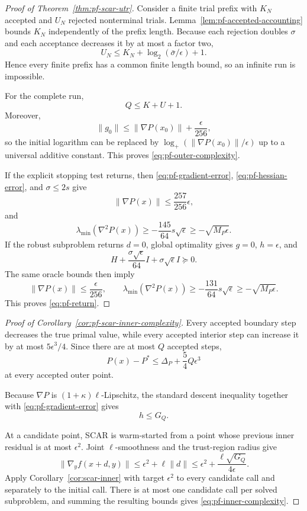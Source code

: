 \begin{proof}[Proof of Theorem~\ref{thm:pf-scar-utr}]
Consider a finite trial prefix with $K_N$ accepted and $U_N$
rejected nonterminal trials.
Lemma~\ref{lem:pf-accepted-accounting} bounds $K_N$ independently of
the prefix length.
Because each rejection doubles $\sigma$ and each acceptance decreases
it by at most a factor two,
\[
    U_N
    \le
    K_N+
    \log_2(\bar\sigma/\epsilon)+1.
\]
Hence every finite prefix has a common finite length bound, so an
infinite run is impossible.

For the complete run,
\[
    Q
    \le
    K+U+1.
\]
Moreover,
\[
    \|g_0\|
    \le
    \|\nabla P(x_0)\|
    +
    \frac{\epsilon}{256},
\]
so the initial logarithm can be replaced by
$\log_+(\|\nabla P(x_0)\|/\epsilon)$ up to a universal additive
constant. This proves \eqref{eq:pf-outer-complexity}.

If the explicit stopping test returns, then
\eqref{eq:pf-gradient-error},
\eqref{eq:pf-hessian-error},
and $\sigma\le2s$ give
\[
    \|\nabla P(x)\|
    \le
    \frac{257}{256}\epsilon,
\]
and
\[
    \lambda_{\min}(\nabla^2P(x))
    \ge
    -\frac{145}{64}s\sqrt\epsilon
    \ge
    -\sqrt{M_P\epsilon}.
\]
If the robust subproblem returns $d=0$, global optimality gives
$g=0$, $h=\epsilon$, and
\[
    H+
    \frac{\sigma\sqrt\epsilon}{64}I
    +
    \sigma\sqrt\epsilon I
    \succeq0.
\]
The same oracle bounds then imply
\[
    \|\nabla P(x)\|
    \le
    \frac{\epsilon}{256},
    \qquad
    \lambda_{\min}(\nabla^2P(x))
    \ge
    -\frac{131}{64}s\sqrt\epsilon
    \ge
    -\sqrt{M_P\epsilon}.
\]
This proves \eqref{eq:pf-return}.
\end{proof}


\begin{proof}[Proof of Corollary~\ref{cor:pf-scar-inner-complexity}]
Every accepted boundary step decreases the true primal value, while
every accepted interior step can increase it by at most
$5\epsilon^3/4$.
Since there are at most $Q$ accepted steps,
\[
    P(x)-P^*
    \le
    \Delta_P+\frac54Q\epsilon^3
\]
at every accepted outer point.

Because $\nabla P$ is $(1+\kappa)\ell$-Lipschitz, the standard
descent inequality together with
\eqref{eq:pf-gradient-error} gives
\[
    h\le G_Q.
\]

At a candidate point, SCAR is warm-started from a point whose previous
inner residual is at most $\epsilon^2$.
Joint $\ell$-smoothness and the trust-region radius give
\[
    \|\nabla_yf(x+d,y)\|
    \le
    \epsilon^2+\ell\|d\|
    \le
    \epsilon^2
    +
    \frac{\ell\sqrt{G_Q}}{4\epsilon}.
\]
Apply Corollary~\ref{cor:scar-inner} with target $\epsilon^2$ to
every candidate call and separately to the initial call.
There is at most one candidate call per solved subproblem, and
summing the resulting bounds gives
\eqref{eq:pf-inner-complexity}.
\end{proof}


